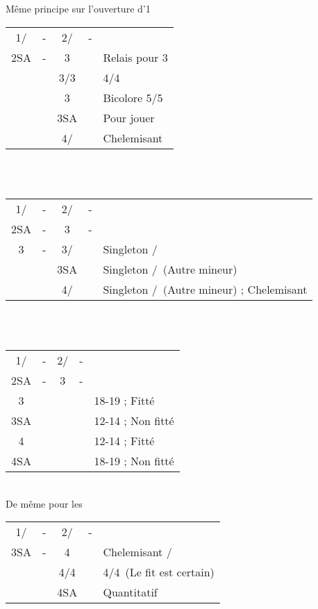 \documentclass[a4paper, oneside, 11pt]{report}
\begin{document}
		Même principe sur l'ouverture d'1\carreau\\

		\begin{tabular}{cccc|l}
		1\trefle/\carreau & - & 2\trefle/\carreau & - &\\
		2SA & - & 3\trefle && Relais pour 3\carreau\\
		&& 3\carreau/3\coeur && 4\coeur/4\pique\\
		&& 3\pique && Bicolore 5\trefle/5\carreau\\
		&& 3SA && Pour jouer\\
		&& 4\trefle/\carreau && Chelemisant\\
		\end{tabular}\\\\

		\begin{tabular}{cccc|l}
		1\trefle/\carreau & - & 2\trefle/\carreau & - &\\
		2SA & - & 3\trefle & - &\\
		3\carreau & - & 3\coeur/\pique && Singleton \coeur/\pique\\	
		&& 3SA && Singleton \carreau/\trefle\ (Autre mineur)\\
		&& 4\trefle/\carreau && Singleton \carreau/\trefle\ (Autre mineur) ; Chelemisant\\
		\end{tabular}\\\\

		\begin{tabular}{cccc|l}
		1\trefle/\carreau & - & 2\trefle/\carreau & - &\\
		2SA & - & 3\carreau & - &\\
		3\coeur &&&& 18-19 ; Fitté\\
		3SA &&&& 12-14 ; Non fitté\\
		4\coeur &&&& 12-14 ; Fitté\\
		4SA &&&& 18-19 ; Non fitté\\
		\end{tabular}\\
		De même pour les \pique\\

		\begin{tabular}{cccc|l}
		1\trefle/\carreau & - & 2\trefle/\carreau & - &\\
		3SA & - & 4\trefle && Chelemisant \trefle/\carreau\\
		&& 4\carreau/4\coeur && 4\coeur/4\pique\ (Le fit est certain)\\
		&& 4SA && Quantitatif\\
		\end{tabular}\\\\
\end{document}
